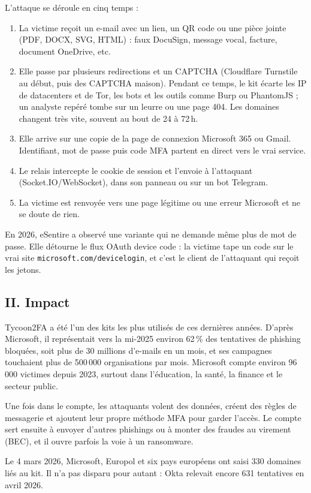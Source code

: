 \documentclass[10pt,a4paper]{article}
\begin{document}
L'attaque se déroule en cinq temps :
\begin{enumerate}
  \item La victime reçoit un e-mail avec un lien, un QR code ou une pièce jointe (PDF, DOCX, SVG, HTML) : faux DocuSign, message vocal, facture, document OneDrive, etc.
  \item Elle passe par plusieurs redirections et un CAPTCHA (Cloudflare Turnstile au début, puis des CAPTCHA maison). Pendant ce temps, le kit écarte les IP de datacenters et de Tor, les bots et les outils comme Burp ou PhantomJS ; un analyste repéré tombe sur un leurre ou une page 404. Les domaines changent très vite, souvent au bout de 24 à 72\,h.
  \item Elle arrive sur une copie de la page de connexion Microsoft 365 ou Gmail. Identifiant, mot de passe puis code MFA partent en direct vers le vrai service.
  \item Le relais intercepte le cookie de session et l'envoie à l'attaquant (Socket.IO/WebSocket), dans son panneau ou sur un bot Telegram.
  \item La victime est renvoyée vers une page légitime ou une erreur Microsoft et ne se doute de rien.
\end{enumerate}
En 2026, eSentire a observé une variante qui ne demande même plus de mot de passe. Elle détourne le flux OAuth \og device code \fg{} : la victime tape un code sur le vrai site \texttt{microsoft.com/devicelogin}, et c'est le client de l'attaquant qui reçoit les jetons.

\subsection{II. Impact}
Tycoon2FA a été l'un des kits les plus utilisés de ces dernières années. D'après Microsoft, il représentait vers la mi-2025 environ 62\,\% des tentatives de phishing bloquées, soit plus de 30 millions d'e-mails en un mois, et ses campagnes touchaient plus de 500\,000 organisations par mois. Microsoft compte environ 96\,000 victimes depuis 2023, surtout dans l'éducation, la santé, la finance et le secteur public.

Une fois dans le compte, les attaquants volent des données, créent des règles de messagerie et ajoutent leur propre méthode MFA pour garder l'accès. Le compte sert ensuite à envoyer d'autres phishings ou à monter des fraudes au virement (BEC), et il ouvre parfois la voie à un ransomware.

Le 4 mars 2026, Microsoft, Europol et six pays européens ont saisi 330 domaines liés au kit. Il n'a pas disparu pour autant : Okta relevait encore 631 tentatives en avril 2026.
\end{document}
